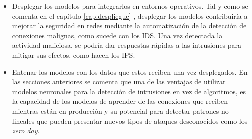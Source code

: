 \begin{itemize}
	\item Desplegar los modelos para integrarlos en entornos operativos. Tal y como se comenta en el capítulo \ref{cap.despliegue} , desplegar los modelos contribuiría a mejorar la seguridad en redes mediante la automatización de la detección de conexiones malignas, como sucede con los IDS. Una vez detectada la actividad maliciosa, se podría dar respuestas rápidas a las intrusiones para mitigar sus efectos, como hacen los IPS.
	
	\item Entenar los modelos con los datos que estos reciben una vez desplegados. En las secciones anteriores se comenta que una de las ventajas de utilizar modelos neuronales para la detección de intrusiones en vez de algoritmos, es la capacidad de los modelos de aprender de las conexiones que reciben mientras están en producción y su potencial para detectar patrones no lineales que pueden presentar nuevos tipos de ataques desconocidos como los \textit{zero day}.
\end{itemize}


